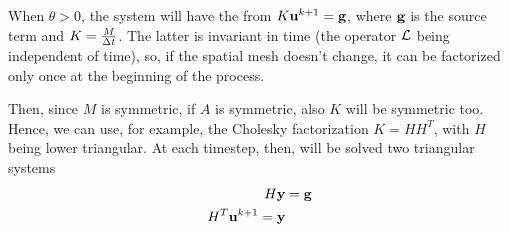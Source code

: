 When \(\theta > 0\), the system will have the from \(K\textbf{u}^{k+1} = \textbf{g}\), where \(\textbf{g}\) is the source term and \(K = \frac{M}{\Delta t}\). The latter is invariant in time (the operator \(\mathcal{L}\) being independent of time), so, if the spatial mesh doesn't change, it can be factorized only once at the beginning of the process. 

Then, since \(M\) is symmetric, if \(A\) is symmetric, also \(K\) will be symmetric too. Hence, we can use, for example, the Cholesky factorization \(K = HH^T\), with \(H\) being lower triangular. At each timestep, then, will be solved two triangular systems 
\begin{align*}
    H\textbf{y} &= \textbf{g} \\
    H^T \textbf{u}^{k+1} = \textbf{y}
\end{align*}
